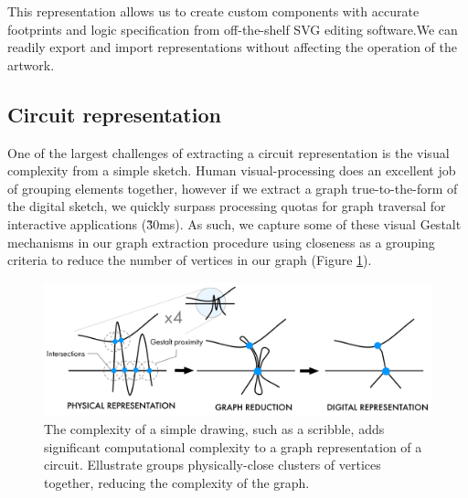 \documentclass{sigchi}
\begin{document}
    This representation allows us to create custom components with accurate footprints and logic specification from off-the-shelf SVG editing software.We can readily export and import representations without affecting the operation of the artwork. 

    \subsection{Circuit representation}
      One of the largest challenges of extracting a circuit representation is the visual complexity from a simple sketch. Human visual-processing does an excellent job of grouping elements together, however if we extract a graph true-to-the-form of the digital sketch, we quickly surpass processing quotas for graph traversal for interactive applications (\~30ms). As such, we capture some of these visual Gestalt mechanisms in our graph extraction procedure using closeness as a grouping criteria to reduce the number of vertices in our graph (Figure \ref{fig:gestalt}). 

      \begin{figure}[t]
        \centering
        \includegraphics[width=1.0\columnwidth]{figures/gestalt.pdf}
        \caption{The complexity of a simple drawing, such as a scribble, adds significant computational complexity to a graph representation of a circuit. Ellustrate groups physically-close clusters of vertices together, reducing the complexity of the graph. }
        \label{fig:gestalt}
        \vspace{-16pt}
      \end{figure}
\end{document}
